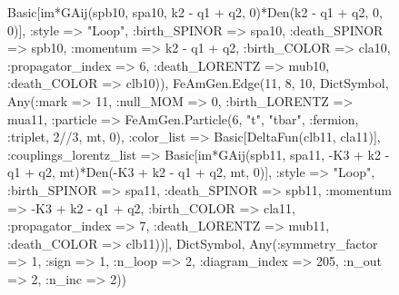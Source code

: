 \documentclass{revtex4}
\begin{document}
\begin{figure}[!htb]
\begin{center}
{Basic[im*GAij(spb10, spa10, k2 - q1 + q2, 0)*Den(k2 - q1 + q2, 0, 0)], :style => "Loop", :birth_SPINOR => spa10, :death_SPINOR => spb10, :momentum => k2 - q1 + q2, :birth_COLOR => cla10, :propagator_index => 6, :death_LORENTZ => mub10, :death_COLOR => clb10)), FeAmGen.Edge(11, 8, 10, Dict{Symbol, Any}(:mark => 11, :null_MOM => 0, :birth_LORENTZ => mua11, :particle => FeAmGen.Particle(6, "t", "tbar", :fermion, :triplet, 2//3, mt, 0), :color_list => Basic[DeltaFun(clb11, cla11)], :couplings_lorentz_list => Basic[im*GAij(spb11, spa11, -K3 + k2 - q1 + q2, mt)*Den(-K3 + k2 - q1 + q2, mt, 0)], :style => "Loop", :birth_SPINOR => spa11, :death_SPINOR => spb11, :momentum => -K3 + k2 - q1 + q2, :birth_COLOR => cla11, :propagator_index => 7, :death_LORENTZ => mub11, :death_COLOR => clb11))], Dict{Symbol, Any}(:symmetry_factor => 1, :sign => 1, :n_loop => 2, :diagram_index => 205, :n_out => 2, :n_inc => 2)) 
}
\end{center}
\end{figure}
\end{document}
